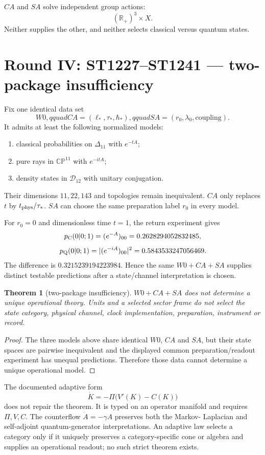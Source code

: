 \documentclass[11pt,a4paper]{article}
\newtheorem{theorem}{Theorem}\newtheorem{proposition}[theorem]{Proposition}\newtheorem{corollary}[theorem]{Corollary}
\begin{document}
$CA$ and $SA$ solve independent group actions:
\[
 (\mathbb R_+)^3\times X.
\]
Neither supplies the other, and neither selects classical versus quantum
states.

\section{Round IV: ST1227--ST1241 --- two-package insufficiency}

Fix one identical data set
\[
 W0,qquad CA=(\ell_*,\tau_*,\hbar_*),qquad
 SA=(r_0,\lambda_0,\text{coupling}).
\]
It admits at least the following normalized models:
\begin{enumerate}
\item classical probabilities on $\Delta_{11}$ with $e^{-tA}$;
\item pure rays in $\mathbb{CP}^{11}$ with $e^{-itA}$;
\item density states in $\mathcal D_{12}$ with unitary conjugation.
\end{enumerate}
Their dimensions $11,22,143$ and topologies remain inequivalent.  $CA$ only
replaces $t$ by $t_{\rm phys}/\tau_*$.  $SA$ can choose the same preparation
label $r_0$ in every model.

For $r_0=0$ and dimensionless time $t=1$, the return experiment gives
\[
 p_{\rm C}(0|0;1)=(e^{-A})_{00}=0.2628294052832485,
\]
\[
 p_{\rm Q}(0|0;1)=|(e^{-iA})_{00}|^2=0.5843533247056469.
\]
The difference is $0.3215239194223984$.  Hence the same $W0+CA+SA$ supplies
distinct testable predictions after a state/channel interpretation is chosen.

\begin{theorem}[two-package insufficiency]
$W0+CA+SA$ does not determine a unique operational theory.  Units and a
selected sector frame do not select the state category, physical channel,
clock implementation, preparation, instrument or record.
\end{theorem}

\begin{proof}
The three models above share identical $W0$, $CA$ and $SA$, but their state
spaces are pairwise inequivalent and the displayed common preparation/readout
experiment has unequal predictions.  Therefore those data cannot determine a
unique operational model.
\end{proof}

The documented adaptive form
\[
 \dot K=-\Pi\bigl(V'(K)-C(K)\bigr)
\]
does not repair the theorem.  It is typed on an operator manifold and requires
$\Pi,V,C$.  The counterflow $\dot A=-\gamma A$ preserves both the Markov-
Laplacian and self-adjoint quantum-generator interpretations.  An adaptive law
selects a category only if it uniquely preserves a category-specific cone or
algebra and supplies an operational readout; no such strict theorem exists.
\end{document}
